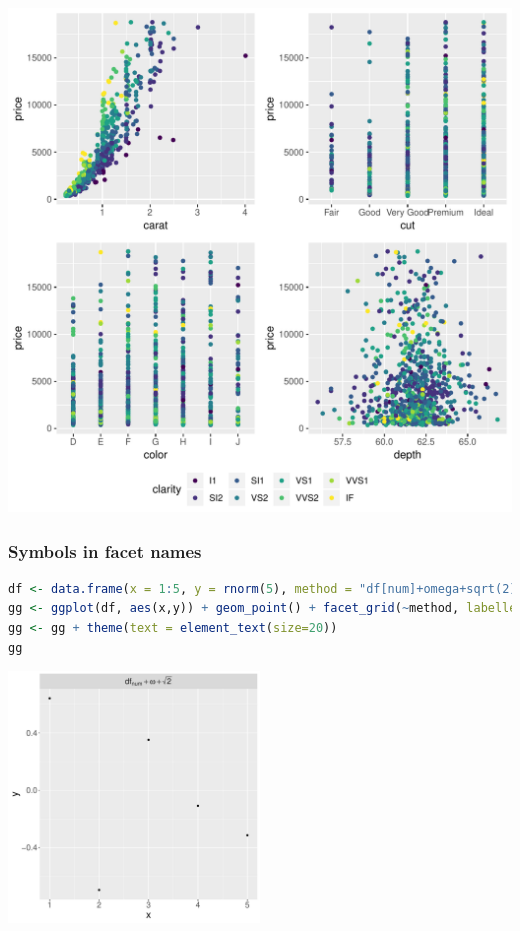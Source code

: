 \documentclass{article}
\begin{document}
\begin{center}
\includegraphics[width=.9\linewidth]{./figures/fig-combine.pdf}
\label{}
\end{center}
\subsubsection{Symbols in facet names}
\label{sec:org0690bdd}

\begin{lstlisting}[language=r,numbers=none]
df <- data.frame(x = 1:5, y = rnorm(5), method = "df[num]+omega+sqrt(2)")
gg <- ggplot(df, aes(x,y)) + geom_point() + facet_grid(~method, labeller = label_parsed)
gg <- gg + theme(text = element_text(size=20))
gg
\end{lstlisting}

\begin{center}
\includegraphics[trim={0 0 0 0},width=0.5\textwidth]{./figures/fig-symbolfacet.pdf}
\end{center}
\end{document}
